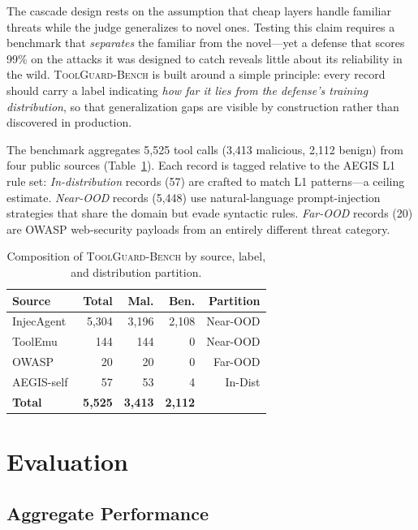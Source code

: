 \documentclass{article}
\newcommand{\bench}{\textsc{ToolGuard-Bench}\xspace}
\begin{document}
The cascade design rests on the assumption that cheap layers handle familiar threats while the judge generalizes to novel ones.
Testing this claim requires a benchmark that \emph{separates} the familiar from the novel---yet a defense that scores 99\% on the attacks it was designed to catch reveals little about its reliability in the wild.
\bench is built around a simple principle: every record should carry a label indicating \emph{how far it lies from the defense's training distribution}, so that generalization gaps are visible by construction rather than discovered in production.

The benchmark aggregates 5{,}525 tool calls (3{,}413 malicious, 2{,}112 benign) from four public sources (Table~\ref{tab:benchcomp}).
Each record is tagged relative to the AEGIS L1 rule set:
\emph{In-distribution} records (57) are crafted to match L1 patterns---a ceiling estimate.
\emph{Near-OOD} records (5{,}448) use natural-language prompt-injection strategies that share the domain but evade syntactic rules.
\emph{Far-OOD} records (20) are OWASP web-security payloads from an entirely different threat category.

\begin{table}[t]
\centering\small
\caption{Composition of \bench by source, label, and distribution partition.}
\vspace{-0.1in}
\label{tab:benchcomp}
\begin{tabular}{lrrrr}
\toprule
Source & Total & Mal. & Ben. & Partition \\
\midrule
InjecAgent~\citep{zhan2024injecagent} & 5{,}304 & 3{,}196 & 2{,}108 & Near-OOD \\
ToolEmu~\citep{ruan2024toolemu} & 144 & 144 & 0 & Near-OOD \\
OWASP~\citep{owasp2025} & 20 & 20 & 0 & Far-OOD \\
AEGIS-self & 57 & 53 & 4 & In-Dist \\
\midrule
\textbf{Total} & \textbf{5{,}525} & \textbf{3{,}413} & \textbf{2{,}112} & \\
\bottomrule
\end{tabular}
\vspace{-0.1in}
\end{table}

\section{Evaluation}
\label{sec:eval}

\subsection{Aggregate Performance}
\end{document}
